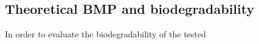 \subsection{Theoretical BMP and biodegradability}
In order to evaluate the biodegradability of the tested
